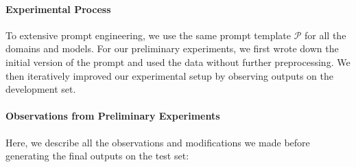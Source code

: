 \paragraph{Experimental Process}
\label{sec:quintd:process}
To extensive prompt engineering, we use the same prompt template $\mathcal{P}$ for all the domains and models. For our preliminary experiments, we first wrote down the initial version of the prompt and used the data without further preprocessing.
We then iteratively improved our experimental setup by observing outputs on the development set.


\paragraph{Observations from Preliminary Experiments}
\label{sec:quintd:observations}
Here, we describe all the observations and modifications we made before generating the final outputs on the test set:


